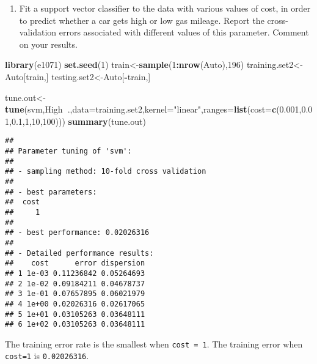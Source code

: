 \documentclass[]{article}
\newenvironment{Shaded}{\begin{snugshade}}{\end{snugshade}}
\newcommand{\KeywordTok}[1]{\textcolor[rgb]{0.13,0.29,0.53}{\textbf{#1}}}
\newcommand{\DataTypeTok}[1]{\textcolor[rgb]{0.13,0.29,0.53}{#1}}
\newcommand{\DecValTok}[1]{\textcolor[rgb]{0.00,0.00,0.81}{#1}}
\newcommand{\FloatTok}[1]{\textcolor[rgb]{0.00,0.00,0.81}{#1}}
\newcommand{\StringTok}[1]{\textcolor[rgb]{0.31,0.60,0.02}{#1}}
\newcommand{\OperatorTok}[1]{\textcolor[rgb]{0.81,0.36,0.00}{\textbf{#1}}}
\newcommand{\NormalTok}[1]{#1}
\providecommand{\tightlist}{%
  \setlength{\itemsep}{0pt}\setlength{\parskip}{0pt}}
\begin{document}
\begin{enumerate}
\def\labelenumi{(\alph{enumi})}
\setcounter{enumi}{1}
\tightlist
\item
  Fit a support vector classifier to the data with various values of
  cost, in order to predict whether a car gets high or low gas mileage.
  Report the cross-validation errors associated with different values of
  this parameter. Comment on your results.
\end{enumerate}

\begin{Shaded}
\begin{Highlighting}[]
\KeywordTok{library}\NormalTok{(e1071)}
\KeywordTok{set.seed}\NormalTok{(}\DecValTok{1}\NormalTok{)}
\NormalTok{train<-}\KeywordTok{sample}\NormalTok{(}\DecValTok{1}\OperatorTok{:}\KeywordTok{nrow}\NormalTok{(Auto),}\DecValTok{196}\NormalTok{)}
\NormalTok{training.set2<-Auto[train,]}
\NormalTok{testing.set2<-Auto[}\OperatorTok{-}\NormalTok{train,]}

\NormalTok{tune.out<-}\KeywordTok{tune}\NormalTok{(svm,High}\OperatorTok{~}\NormalTok{.,}\DataTypeTok{data=}\NormalTok{training.set2,}\DataTypeTok{kernel=}\StringTok{"linear"}\NormalTok{,}\DataTypeTok{ranges=}\KeywordTok{list}\NormalTok{(}\DataTypeTok{cost=}\KeywordTok{c}\NormalTok{(}\FloatTok{0.001}\NormalTok{,}\FloatTok{0.01}\NormalTok{,}\FloatTok{0.1}\NormalTok{,}\DecValTok{1}\NormalTok{,}\DecValTok{10}\NormalTok{,}\DecValTok{100}\NormalTok{)))}
\KeywordTok{summary}\NormalTok{(tune.out)}
\end{Highlighting}
\end{Shaded}

\begin{verbatim}
## 
## Parameter tuning of 'svm':
## 
## - sampling method: 10-fold cross validation 
## 
## - best parameters:
##  cost
##     1
## 
## - best performance: 0.02026316 
## 
## - Detailed performance results:
##    cost      error dispersion
## 1 1e-03 0.11236842 0.05264693
## 2 1e-02 0.09184211 0.04678737
## 3 1e-01 0.07657895 0.06021979
## 4 1e+00 0.02026316 0.02617065
## 5 1e+01 0.03105263 0.03648111
## 6 1e+02 0.03105263 0.03648111
\end{verbatim}

The training error rate is the smallest when \texttt{cost\ =\ 1}. The
training error when \texttt{cost=1} is \texttt{0.02026316}.

\begin{Shaded}
\end{Shaded}
\end{document}

